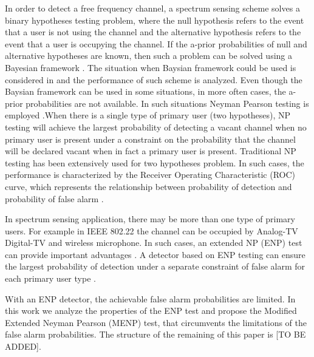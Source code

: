 In order to detect a free frequency channel, a spectrum sensing scheme solves a binary hypotheses testing problem, where the null hypothesis refers to the event that a user is not using the channel and the alternative hypothesis refers to the event that a user is occupying the channel. If the a-prior probabilities of null and alternative hypotheses are known, then such a problem can be solved using a Bayesian framework \cite{poor1994introduction}. The situation when Baysian framework could be used is considered in \cite{zeng2010review} and the performance of such scheme is analyzed.
Even though the Baysian framework can be used in some situations, in more often cases, the a-prior probabilities are not available. In such situations Neyman Pearson testing is employed \cite{poor1994introduction}.When there is a single type of primary user (two hypotheses), NP testing will achieve the largest probability of detecting a vacant channel when no primary user is present under a constraint on the probability that the channel will be declared vacant when in fact a primary user is present.
Traditional NP testing has been extensively used for two hypotheses problem. In such cases,  the performance is characterized by the Receiver Operating Characteristic (ROC) curve, which represents the relationship between probability of detection and probability of false alarm \cite{poor1994introduction}. 

In spectrum sensing application, there may be more than one type of primary users. For example in IEEE 802.22 \cite{shellhammer2008spectrum} the channel can be occupied by Analog-TV Digital-TV and wireless microphone. In such cases, an extended NP (ENP) test can provide important advantages \cite{zhang1999design}. A detector based on ENP testing can ensure the largest probability of detection under a separate constraint of false alarm for each primary user type \cite{LehmannTest}.

With an ENP detector, the achievable false alarm probabilities are limited. In this work we analyze the properties of the ENP test and propose the Modified Extended Neyman Pearson (MENP) test, that circumvents the limitations of the false alarm probabilities. The structure of the remaining of this paper is [TO BE ADDED].
